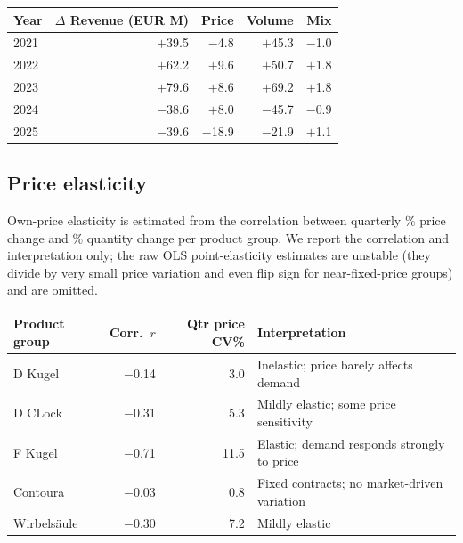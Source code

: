 \documentclass{article}
\begin{document}
\small
\setlength{\tabcolsep}{4pt}
\renewcommand{\arraystretch}{1.15}
\begin{tabular}{@{}l r r r r@{}}
\toprule
\textbf{Year} & \textbf{$\Delta$ Revenue (EUR M)} & \textbf{Price} & \textbf{Volume} & \textbf{Mix} \\
\midrule
2021 & $+$39.5 & $-$4.8  & $+$45.3 & $-$1.0 \\
2022 & $+$62.2 & $+$9.6  & $+$50.7 & $+$1.8 \\
2023 & $+$79.6 & $+$8.6  & $+$69.2 & $+$1.8 \\
2024 & $-$38.6 & $+$8.0  & $-$45.7 & $-$0.9 \\
2025 & $-$39.6 & $-$18.9 & $-$21.9 & $+$1.1 \\
\bottomrule
\end{tabular}
\label{tab:sap-pvm}
\normalsize

\subsection{Price elasticity}
\label{app:sap-elasticity}
Own-price elasticity is estimated from the correlation between quarterly \% price change and
\% quantity change per product group. We report the correlation and interpretation only; the
raw OLS point-elasticity estimates are unstable (they divide by very small price variation and
even flip sign for near-fixed-price groups) and are omitted.\\[0.5em]

\small
\setlength{\tabcolsep}{4pt}
\renewcommand{\arraystretch}{1.15}
\begin{tabular}{@{}l r r p{6.2cm}@{}}
\toprule
\textbf{Product group} & \textbf{Corr.\ $r$} & \textbf{Qtr price CV\%} & \textbf{Interpretation} \\
\midrule
D Kugel     & $-$0.14 & 3.0  & Inelastic; price barely affects demand \\
D CLock     & $-$0.31 & 5.3  & Mildly elastic; some price sensitivity \\
F Kugel     & $-$0.71 & 11.5 & Elastic; demand responds strongly to price \\
Contoura    & $-$0.03 & 0.8  & Fixed contracts; no market-driven variation \\
Wirbelsäule & $-$0.30 & 7.2  & Mildly elastic \\
\bottomrule
\end{tabular}
\label{tab:sap-elasticity}
\normalsize
\end{document}
